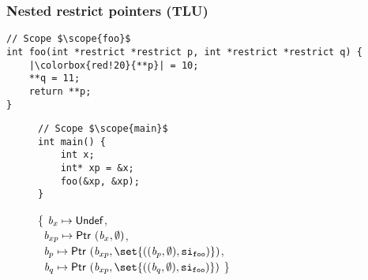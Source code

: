 \begin{frame}[fragile]
\frametitle{Nested restrict pointers (TLU)}
\begin{verbatim}
// Scope $\scope{foo}$
int foo(int *restrict *restrict p, int *restrict *restrict q) {
    |\colorbox{red!20}{**p}| = 10;
    **q = 11;
    return **p;
}
\end{verbatim}

\vspace*{-2cm}

\begin{figure}[!h]
\begin{minipage}[t]{.3\textwidth}
\begin{verbatim}
// Scope $\scope{main}$
int main() {
    int x;
    int* xp = &x;
    foo(&xp, &xp);
}
\end{verbatim}
\end{minipage}%
\begin{minipage}{.7\textwidth}

\executionannotation
{
\{ $\textit{b}_x \mapsto \mathsf{Undef}$, \\
    \ $\textit{b}_{xp} \mapsto \mathsf{Ptr} \ (\textit{b}_x, \emptyset)$, \\
    \ $\Blockvar_p \mapsto \ptr{(\Blockvar_{xp}, \set{((\Blockvar_p, \emptyset), \scope{foo})})}$, \\
    \ $\Blockvar_q \mapsto \ptr{(\Blockvar_{xp}, \set{((\Blockvar_q, \emptyset), \scope{foo})})}$ \}
}
{
}

\end{minipage}
\end{figure}

\end{frame}



